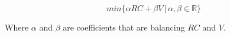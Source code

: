 \begin{equation}
    min \{ \alpha RC + \beta V \,|\, \alpha, \beta \in \mathbb{R} \}
\end{equation}

Where $\alpha$ and $\beta$ are coefficients that are balancing $RC$ and $V$.



